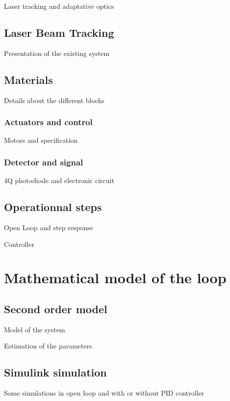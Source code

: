 \documentclass[14pt,fleqn]{book} %
\begin{document}
Laser tracking and adaptative optics
%
\section{Laser Beam Tracking}

Presentation of the existing system 

%
\section{Materials}

Details about the different blocks

\subsection{Actuators and control}

Motors and specification

\subsection{Detector and signal}

4Q photodiode and electronic circuit

%
\section{Operationnal steps}

Open Loop and step response

Controller 

\chapter{Mathematical model of the loop}

\section{Second order model}

Model of the system

Estimation of the parameters

\section{Simulink\textregistered{} simulation}

Some simulations in open loop and with or without PID controller
\end{document}
